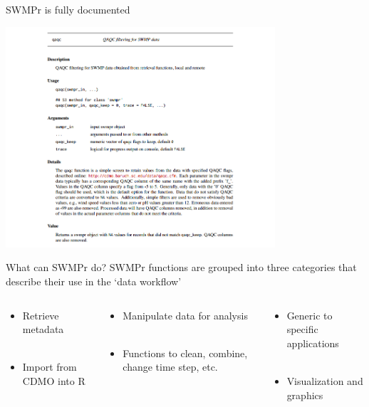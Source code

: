 \documentclass[serif]{beamer}\usepackage[]{graphicx}\usepackage[]{color}
\newcommand{\Bigtxt}[1]{\textbf{\textit{#1}}}
\begin{document}
\begin{frame}[fragile]{SWMPr is fully documented}
\centerline{\includegraphics[width = 0.75\textwidth]{fig/help_ex.png}}
\end{frame}

\begin{frame}[t]{What can SWMPr do?}
SWMPr functions are grouped into three categories that describe their use in the `data workflow'
\begin{center}
\end{center}
\begin{columns}[t]
\begin{column}{0.3\textwidth}
\small{
\begin{itemize}
\item Retrieve metadata \\~\\
\item Import from CDMO into R
\end{itemize}
}
\end{column}
\begin{column}{0.3\textwidth}
\small{
\begin{itemize}
\item Manipulate data for analysis \\~\\
\item Functions to clean, combine, change time step, etc.
\end{itemize}
}
\end{column}
\begin{column}{0.3\textwidth}
\small{
\begin{itemize}
\item Generic to specific applications\\~\\
\item Visualization and graphics
\end{itemize}
}
\end{column}
\end{columns}
\end{frame}
\end{document}
